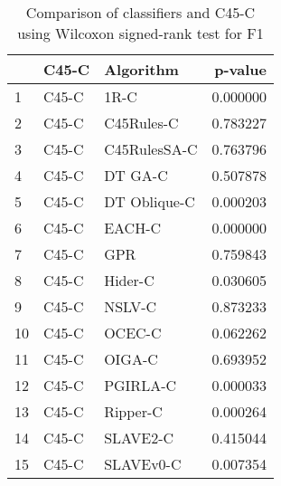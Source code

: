 \begin{table}
\footnotesize
\caption{Comparison of classifiers and C45-C using Wilcoxon signed-rank test for F1}
\label{tab:C45-C wilcoxon F1 comparison}
\begin{tabular}{lllr}
\hline
 & C45-C & Algorithm & p-value \\
\hline
1 & C45-C & 1R-C & 0.000000 \\
2 & C45-C & C45Rules-C & 0.783227 \\
3 & C45-C & C45RulesSA-C & 0.763796 \\
4 & C45-C & DT GA-C & 0.507878 \\
5 & C45-C & DT Oblique-C & 0.000203 \\
6 & C45-C & EACH-C & 0.000000 \\
7 & C45-C & GPR & 0.759843 \\
8 & C45-C & Hider-C & 0.030605 \\
9 & C45-C & NSLV-C & 0.873233 \\
10 & C45-C & OCEC-C & 0.062262 \\
11 & C45-C & OIGA-C & 0.693952 \\
12 & C45-C & PGIRLA-C & 0.000033 \\
13 & C45-C & Ripper-C & 0.000264 \\
14 & C45-C & SLAVE2-C & 0.415044 \\
15 & C45-C & SLAVEv0-C & 0.007354 \\
\hline
\end{tabular}
\end{table}

